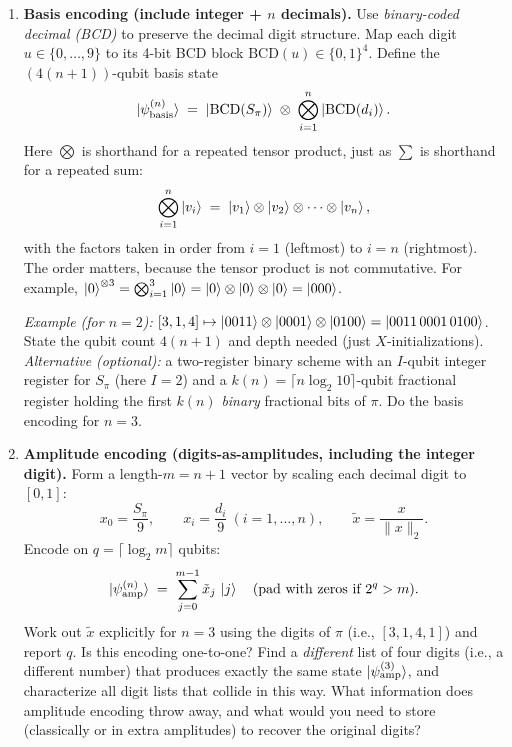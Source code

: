 \documentclass[11pt]{article}
\begin{document}
\begin{enumerate}[label=(\alph*)]
  \item \textbf{Basis encoding (include integer + \(n\) decimals).}
  Use \emph{binary-coded decimal (BCD)} to preserve the decimal digit structure. Map each digit \(u\in\{0,\dots,9\}\) to its 4-bit BCD block \(\mathrm{BCD}(u)\in\{0,1\}^4\). Define the \((4(n{+}1))\)-qubit basis state
  \[
  \ket{\psi_{\mathrm{basis}}^{(n)}} \;=\; \ket{\mathrm{BCD}(S_\pi)}\;\otimes\; \bigotimes_{i=1}^{n}\ket{\mathrm{BCD}(d_i)}.
  \]
  Here \(\bigotimes\) is shorthand for a repeated tensor product, just as \(\sum\) is shorthand for a repeated sum:
  \[
  \bigotimes_{i=1}^{n}\ket{v_i} \;=\; \ket{v_1}\otimes\ket{v_2}\otimes\cdots\otimes\ket{v_n},
  \]
  with the factors taken in order from \(i=1\) (leftmost) to \(i=n\) (rightmost). The order matters, because the tensor product is not commutative. For example, \(\ket{0}^{\otimes 3}=\bigotimes_{i=1}^{3}\ket{0}=\ket{0}\otimes\ket{0}\otimes\ket{0}=\ket{000}\).\par\smallskip
  \emph{Example (for \(n=2\)):} \([3,1,4]\mapsto \ket{0011}\otimes\ket{0001}\otimes\ket{0100} = \ket{0011\,0001\,0100}\).
  State the qubit count \(4(n{+}1)\) and depth needed (just \(X\)-initializations).  
  \emph{Alternative (optional):} a two-register binary scheme with an \(I\)-qubit integer register for \(S_\pi\) (here \(I=2\)) and a \(k(n)=\lceil n\log_2 10\rceil\)-qubit fractional register holding the first \(k(n)\) \emph{binary} fractional bits of \(\pi\). Do the basis encoding for $n=3$.

  \item \textbf{Amplitude encoding (digits-as-amplitudes, including the integer digit).}
  Form a length-\(m=n{+}1\) vector by scaling each decimal digit to \([0,1]\):
  \[
  x_0=\frac{S_\pi}{9},\qquad x_i=\frac{d_i}{9}\ (i=1,\dots,n),\qquad 
  \tilde x=\frac{x}{\|x\|_2}.
  \]
  Encode on \(q=\lceil\log_2 m\rceil\) qubits:
  \[
  \ket{\psi_{\mathrm{amp}}^{(n)}} \;=\; \sum_{j=0}^{m-1}\tilde x_{j}\,\ket{j}\quad(\text{pad with zeros if }2^q>m).
  \]
  Work out \(\tilde x\) explicitly for \(n=3\) using the digits of \(\pi\) (i.e., \([3,1,4,1]\)) and report \(q\).
  Is this encoding one-to-one? Find a \emph{different} list of four digits (i.e., a different number) that produces exactly the same state \(\ket{\psi_{\mathrm{amp}}^{(3)}}\), and characterize all digit lists that collide in this way. What information does amplitude encoding throw away, and what would you need to store (classically or in extra amplitudes) to recover the original digits?


\end{enumerate}
\end{document}
